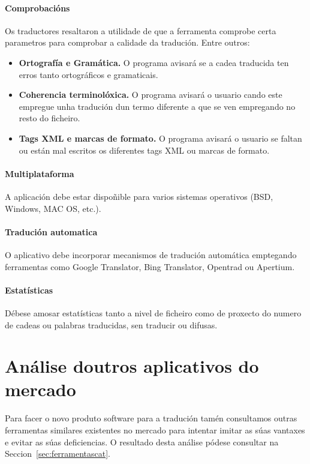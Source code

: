 	\paragraph{Comprobacións} Os traductores resaltaron a utilidade de que a ferramenta comprobe certa parametros para comprobar a calidade da tradución. Entre outros:
		\begin{itemize}
			\item \textbf{Ortografía e Gramática.} O programa avisará se a cadea traducida ten erros tanto ortográficos e gramaticais.
			\item \textbf{Coherencia terminolóxica.} O programa avisará o usuario cando este empregue unha tradución dun termo diferente a que se ven empregando no resto do ficheiro.
			\item \textbf{Tags XML e marcas de formato.} O programa avisará o usuario se faltan ou están mal escritos os diferentes tags XML ou marcas de formato.
		\end{itemize}

	\paragraph{Multiplataforma} A aplicación debe estar dispoñible para varios sistemas operativos (BSD, Windows, MAC OS, etc.).

	\paragraph{Tradución automatica} O aplicativo debe incorporar mecanismos de tradución automática emptegando ferramentas como Google Translator, Bing Translator, Opentrad ou Apertium.

	\paragraph{Estatísticas} Débese amosar estatísticas tanto a nivel de ficheiro como de proxecto do numero de cadeas ou palabras traducidas, sen traducir ou difusas.

\section{Análise doutros aplicativos do mercado}
Para facer o novo produto software para a tradución tamén consultamos outras ferramentas similares existentes no mercado para intentar imitar as súas vantaxes e evitar as súas deficiencias. O resultado desta análise pódese consultar na Seccion~\ref{sec:ferramentascat}.

